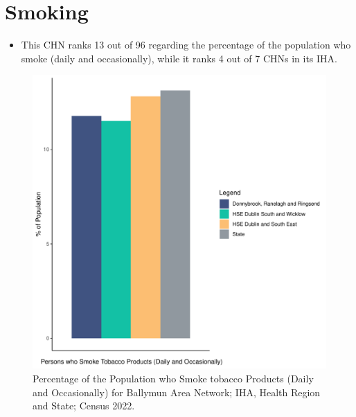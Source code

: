 \documentclass{article}
\begin{document}
\pagebreak

\section{Smoking}\label{sect:Smoking}
\begin{itemize}
\item This CHN ranks  13 out of 96 regarding the percentage of the population who smoke (daily and occasionally), while it ranks   4 out of 7 CHNs in its IHA.
\end{itemize}
\begin{figure}[H]
	\centering
	\includegraphics[width = 120mm]{../figures/SmokingED.pdf}
	\caption{Percentage of the Population who Smoke tobacco Products (Daily and Occasionally) for Ballymun Area Network; IHA, Health Region and State; Census 2022.}
	\label{fig:2ae19629-1a6a-13a3-e055-000000000001}
	\end{figure}
	
\end{document}
